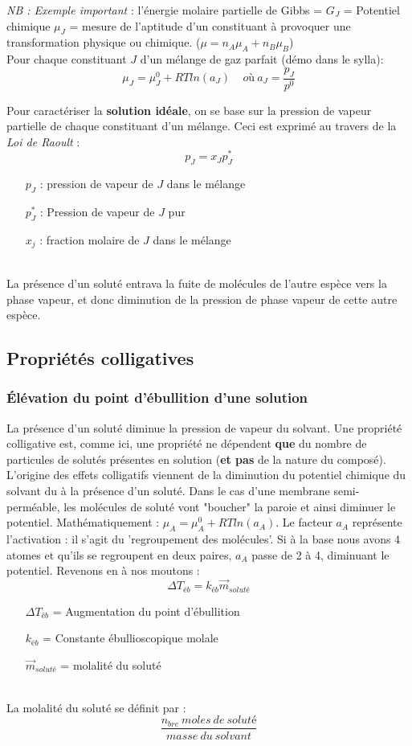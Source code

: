 \documentclass[12pt, a4paper]{article}
\begin{document}
\textit{NB : Exemple important} : l'énergie molaire partielle de Gibbs = $G_J$ = Potentiel chimique $\mu_J$ = mesure de l'aptitude d'un constituant à provoquer une transformation physique ou chimique. ($\mu = n_A \mu_A + n_B \mu_B$)\\
Pour chaque constituant $J$ d'un mélange de gaz parfait (démo dans le sylla):
$$\mu_J = \mu_J^0 + RT ln(a_J)\ \ \ \ \ où\ a_J = \frac{p_J}{p^0}$$

Pour caractériser la \textbf{solution idéale}, on se base sur la pression de vapeur partielle de chaque constituant d'un mélange. Ceci est exprimé au travers de la \textit{Loi de Raoult} :
$$p_J = x_J p_J^*$$
\begin{itemize}
\item[$p_J$] : pression de vapeur de $J$ dans le mélange
\item[$p^*_J$] : Pression de vapeur de $J$ pur
\item[$x_j$] : fraction molaire de $J$ dans le mélange
\end{itemize}
\ \\ La présence d'un soluté entrava la fuite de molécules de l'autre espèce vers la phase vapeur, et donc diminution de la pression de phase vapeur de cette autre espèce.

\subsection{Propriétés colligatives}
\subsubsection{Élévation du point d'ébullition d'une solution}
La présence d'un soluté diminue la pression de vapeur du solvant. Une propriété colligative est, comme ici, une propriété ne dépendent \textbf{que} du nombre de particules de solutés présentes en solution (\textbf{et pas} de la nature du composé).\\
L'origine des effets colligatifs viennent de la diminution du potentiel chimique du solvant du à la présence d'un soluté. Dans le cas d'une membrane semi-perméable, les molécules de soluté vont "boucher" la paroie et ainsi diminuer le potentiel. Mathématiquement : $\mu_A = \mu_A^0 + RT ln(a_A)$. Le facteur $a_A$ représente l'activation : il s'agit du 'regroupement des molécules'. Si à la base nous avons 4 atomes et qu'ils se regroupent en deux paires, $a_A$ passe de 2 à 4, diminuant le potentiel. Revenons en à nos moutons : 
$$\Delta T_{éb} = k_{éb}\vec{m}_{soluté}$$
\begin{itemize}
\item[$\Delta T_{éb}$] = Augmentation du point d'ébullition
\item[$k_{éb}$] = Constante ébullioscopique molale
\item[$\vec{m}_{soluté}$] = molalité du soluté
\end{itemize}
\ \\
La molalité du soluté se définit par : 
$$\frac{n_{bre}\ moles\ de\ soluté}{masse\ du\ solvant}$$
\end{document}
